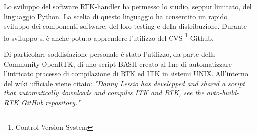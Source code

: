 \documentclass[a4paper,12pt, doubleside]{report}
\begin{document}
            \bigskip
            \par
                Lo sviluppo del software RTK-handler ha permesso lo studio, seppur limitato, del linguaggio Python. La scelta di questo linguaggio ha consentito un rapido sviluppo dei componenti software, del loro testing e della distribuzione. Durante lo sviluppo si è anche potuto apprendere l'utilizzo del CVS \footnote{Control Version System} Github.
            
            \bigskip
            \par
                Di particolare soddisfazione personale è stato l'utilizzo, da parte della Community OpenRTK, di uno script BASH creato al fine di automatizzare l'intricato processo di compilazione di RTK ed ITK in sistemi UNIX. All'interno del wiki ufficiale viene citato:
                \textit{"Danny Lessio has developped and shared a script that automatically downloads and compiles ITK and RTK, see the auto-build-RTK GitHub repository."} \cite{wiki-rtk}
             
\end{document}
